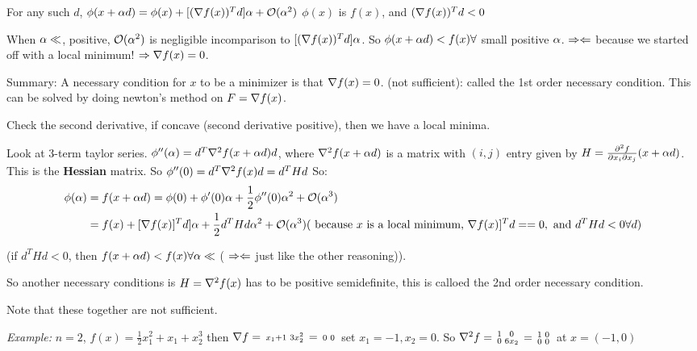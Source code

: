 For any such $d$, $\phi(x+\alpha d) = \phi(x) + [(\nabla f(x))^Td]\alpha + \mathcal{O}(\alpha^2)$
$\phi(x)$ is $f(x)$, and $(\nabla f(x))^Td < 0$

When $\alpha \ll$, positive, $\mathcal{O}(\alpha^2)$ is negligible incomparison to
$[(\nabla f(x))^Td]\alpha$. So $\phi(x+\alpha d) < f(x) \forall$ small
positive $\alpha$. 
$\Rightarrow\Leftarrow$ because we started off with a local minimum! $\Rightarrow \nabla
f(x) = 0$.

Summary: A necessary condition for $x$ to be a minimizer is that
$\nabla f(x) = 0$. (not sufficient): called the 1st order necessary condition.
This can be solved by doing newton's method on $F=\nabla f(x)$.

Check the second derivative, if concave (second derivative positive), then we have a local minima.

Look at 3-term taylor series.
$\phi''(\alpha) = d^T\nabla^2f(x+\alpha d)d$, where $\nabla^2f(x+\alpha
d)$ is a matrix with $(i,j)$ entry given by $H = \frac{\partial^2
  f}{\partial x_i \partial x_j}(x+\alpha d)$. This is the
\textbf{Hessian} matrix.
So $\phi''(0) = d^T\nabla^2 f(x) d = d^THd$
So:
\begin{align*}
\phi(\alpha) &= f(x+\alpha d) = \phi(0) + \phi'(0)\alpha + \frac{1}{2}\phi''(0)\alpha^2 +
\mathcal{O}(\alpha^3)\\
&= f(x) + [\nabla f(x)]^Td]\alpha + \frac{1}{2}d^THd \alpha^2 + \mathcal{O}(\alpha^3)
(\text{ because $x$ is a local minimum, } \nabla f(x)]^Td == 0, \text{
  and } d^THd < 0 \forall d)\\  
\end{align*}

(if $d^THd < 0$, then $f(x+\alpha d) < f(x)\forall \alpha \ll$ ( $\Rightarrow\Leftarrow$ just
like the other reasoning)).

So another necessary conditions is $H = \nabla^2f(x)$ has to be positive
semidefinite, this is calloed the 2nd order necessary condition.

Note that these together are not sufficient.

\emph{Example:} $n=2$, $f(x) = \frac{1}{2}x_1^2 + x_1 + x_2^3$
then $\nabla f =
\begin{smallmatrix}
x_1+1 & 3x_2^2  
\end{smallmatrix} = \begin{smallmatrix}
0 & 0
\end{smallmatrix}$ set $x_1 = -1, x_2 = 0$.
So $\nabla^2 f =
\begin{smallmatrix}
  1 & 0 \\ 0 & 6x_2
\end{smallmatrix} =
\begin{smallmatrix}
  1 & 0 \\ 0 & 0
\end{smallmatrix}$ at $x=(-1,0)$

